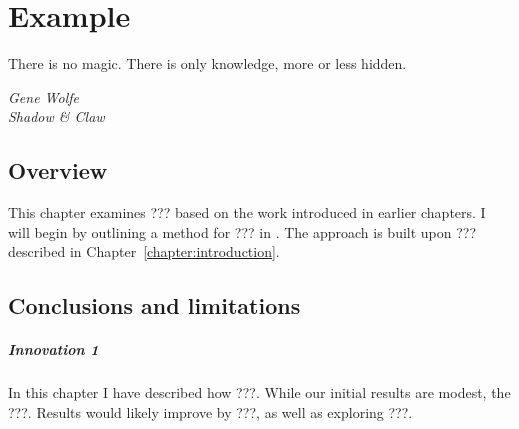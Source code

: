 \chapter{Example}
\label{chapter:example}

\epigraph{There is no magic. There is only knowledge, more or less hidden.}{\textit{Gene Wolfe \\ Shadow \& Claw}}


\section{Overview}
\label{sec:example-overview}
This chapter examines ??? based on the work introduced in earlier chapters. 
I will begin by outlining a method for ??? in \citet{???}.  
The approach is built upon ??? described in Chapter~\ref{chapter:introduction}.  




\section{Conclusions and limitations}
\label{sec:example-conclusion}
\paragraph{Innovation 1} In this chapter I have described how ???.  
While our initial results are modest, the ???.  Results would likely improve by ???, as well as exploring ???.